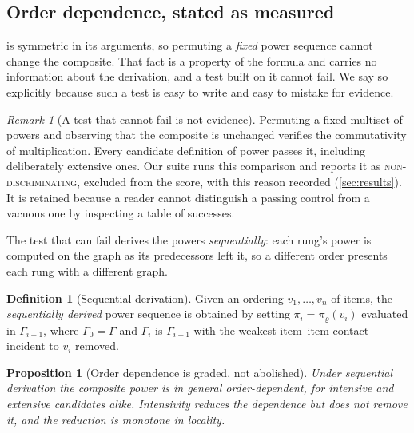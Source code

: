 \documentclass[11pt,twocolumn,a4paper]{article}
\theoremstyle{plain}
\newtheorem{proposition}[theorem]{Proposition}
\theoremstyle{definition}
\newtheorem{definition}[theorem]{Definition}
\theoremstyle{remark}
\newtheorem{remark}[theorem]{Remark}
\newcommand{\Gph}{\Gamma}
\newcommand{\pow}{\pi}
\newcommand{\rad}{\varrho}
\begin{document}
\subsection{Order dependence, stated as measured}
\label{sec:order}

 is symmetric in its arguments, so permuting a \emph{fixed}
power sequence cannot change the composite. That fact is a property of the
formula and carries no information about the derivation, and a test built on it
cannot fail. We say so explicitly because such a test is easy to write and
easy to mistake for evidence.

\begin{remark}[A test that cannot fail is not evidence]
\label{rem:nondisc}
Permuting a fixed multiset of powers and observing that the composite is
unchanged verifies the commutativity of multiplication. Every candidate
definition of power passes it, including deliberately extensive ones. Our suite
runs this comparison and reports it as \textsc{non-discriminating}, excluded
from the score, with this reason recorded (\cref{sec:results}). It is retained
because a reader cannot distinguish a passing control from a vacuous one by
inspecting a table of successes.
\end{remark}

The test that can fail derives the powers \emph{sequentially}: each rung's power
is computed on the graph as its predecessors left it, so a different order
presents each rung with a different graph.

\begin{definition}[Sequential derivation]
\label{def:seqderiv}
Given an ordering $v_1,\dots,v_n$ of items, the \emph{sequentially derived}
power sequence is obtained by setting $\pow_i=\pow_\rad(v_i)$ evaluated in
$\Gph_{i-1}$, where $\Gph_0=\Gph$ and $\Gph_i$ is $\Gph_{i-1}$ with the
weakest item--item contact incident to $v_i$ removed.
\end{definition}

\begin{proposition}[Order dependence is graded, not abolished]
\label{prop:graded}
Under sequential derivation the composite power is in general
order-dependent, for intensive and extensive candidates alike. Intensivity
reduces the dependence but does not remove it, and the reduction is monotone in
locality.
\end{proposition}
\end{document}
